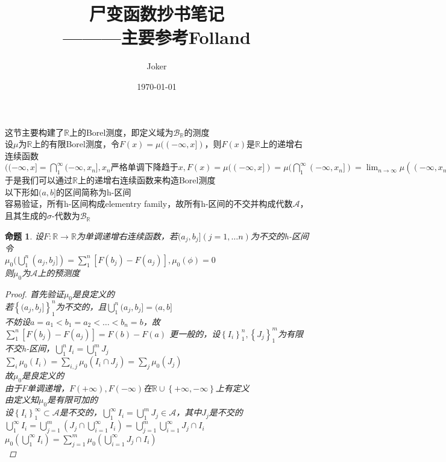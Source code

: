 \documentclass[12pt, a4paper, oneside]{ctexbook}
\title{{\Huge{\textbf{尸变函数抄书笔记}}}\\———主要参考Folland}
\author{Joker}
\date{\today}
\newtheorem{proposition}[theorem]{命题}
\begin{document}
这节主要构建了$\mathbb{R}$上的Borel测度，即定义域为$\mathcal{B}_{\mathbb{R}}$的测度\\
设$\mu$为$\mathbb{R}$上的有限Borel测度，令$F(x)=\mu((-\infty,x])$，则$F(x)$是$\mathbb{R}$上的递增右连续函数
$((-\infty,x]=\bigcap_1^{\infty}(-\infty,x_n],x_n\text{严格单调下降趋于}x,F(x)=\mu((-\infty,x])
=\mu(\bigcap_1^{\infty}(-\infty,x_n])=\lim_{n\to\infty}\mu((-\infty,x_n])=\lim_{n\to\infty}F(x_n),\text{由海涅定理知}F\text{右连续})$\\
于是我们可以通过$\mathbb{R}$上的递增右连续函数来构造Borel测度\\
以下形如$(a,b]$的区间简称为h-区间\\
容易验证，所有h-区间构成elementry family，故所有h-区间的不交并构成代数$\mathcal{A}$，且其生成的$\sigma$-代数为$\mathcal{B}_{\mathbb{R}}$\\
\begin{proposition}
    设$F:\mathbb{R}\to\mathbb{R}$为单调递增右连续函数，若$(a_j,b_j](j=1,\dots n)$为不交的h-区间
    令\\
    $\mu_0(\bigcup_1^n(a_j,b_j])=\sum_1^n[F(b_j)-F(a_j)],\mu_0(\phi)=0$\\
    则$\mu_0$为$\mathcal{A}$上的预测度
    \begin{proof}
        首先验证$\mu_0$是良定义的\\
        若$\left\{(a_j,b_j]\right\}_1^n$为不交的，且$\bigcup_1^n(a_j,b_j]=(a,b]$\\
        不妨设$a=a_1<b_1=a_2<\dots<b_n=b$，故$\sum_1^n[F(b_j)-F(a_j)]=F(b)-F(a)$
        更一般的，设$\left\{I_i\right\}_1^n,\left\{J_j\right\}_1^m$为有限不交h-区间，$\bigcup_1^nI_i=\bigcup_1^mJ_j$\\
        $\sum_i\mu_0(I_i)=\sum_{i,j}\mu_0(I_i\cap J_j)=\sum_j\mu_0(J_j)$\\
        故$\mu_0$是良定义的\\
        由于$F$单调递增，$F(+\infty),F(-\infty)$在$\mathbb{R}\cup\left\{+\infty,-\infty\right\}$上有定义\\
        由定义知$\mu_0$是有限可加的\\
        设$\left\{I_i\right\}_1^{\infty}\subset\mathcal{A}$是不交的，$\bigcup_1^{\infty}I_i=\bigcup_1^mJ_j\in\mathcal{A}$，其中$J_j$是不交的\\
        $\bigcup_1^{\infty}I_i=\bigcup_{j=1}^m(J_j\cap\bigcup_{i=1}^{\infty}I_i)=\bigcup_{j=1}^m\bigcup_{i=1}^{\infty}J_j\cap I_i$\\
        $\mu_0(\bigcup_1^{\infty}I_i)=\sum_{j=1}^m\mu_0(\bigcup_{i=1}^{\infty}J_j\cap I_i)$\\

\end{proof}
\end{proposition}
\end{document}
